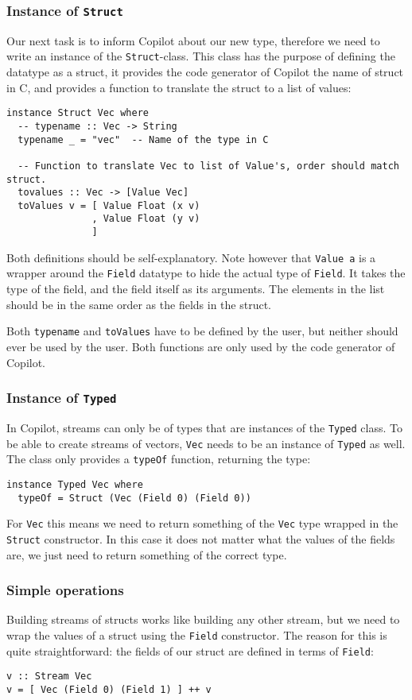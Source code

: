 \subsubsection*{Instance of \texttt{Struct}}
Our next task is to inform Copilot about our new type, therefore we need to
write an instance of the \texttt{Struct}-class. This class has the purpose of
defining the datatype as a struct, it provides the code generator of Copilot the
name of struct in C, and provides a function to translate the struct to a list
of values:
\begin{lstlisting}[language=Copilot]
instance Struct Vec where
  -- typename :: Vec -> String
  typename _ = "vec"  -- Name of the type in C

  -- Function to translate Vec to list of Value's, order should match struct.
  tovalues :: Vec -> [Value Vec]
  toValues v = [ Value Float (x v)
               , Value Float (y v)
               ]
\end{lstlisting}
Both definitions should be self-explanatory. Note however that
\texttt{Value a} is a wrapper around the \texttt{Field} datatype to hide the
actual type of \texttt{Field}. It takes the type of the field, and the field
itself as its arguments. The elements in the list should be in the same order
as the fields in the struct.

Both \texttt{typename} and \texttt{toValues} have to be defined by the user,
but neither should ever be used by the user. Both functions are only used by
the code generator of Copilot.


\subsubsection*{Instance of \texttt{Typed}}
In Copilot, streams can only be of types that are instances of the \texttt{Typed}
class. To be able to create streams of vectors, \texttt{Vec} needs to be an
instance of \texttt{Typed} as well. The class only provides a \texttt{typeOf}
function, returning the type:
\begin{lstlisting}[language=Copilot]
instance Typed Vec where
  typeOf = Struct (Vec (Field 0) (Field 0))
\end{lstlisting}
For \texttt{Vec} this means we need to return something of the \texttt{Vec}
type wrapped in the \texttt{Struct} constructor. In this case it does not
matter what the values of the fields are, we just need to return something of
the correct type.


\subsubsection*{Simple operations}
Building streams of structs works like building any other stream, but we need
to wrap the values of a struct using the \texttt{Field} constructor. The reason
for this is quite straightforward: the fields of our struct are defined in
terms of \texttt{Field}:
\begin{lstlisting}[language=Copilot]
v :: Stream Vec
v = [ Vec (Field 0) (Field 1) ] ++ v
\end{lstlisting}

